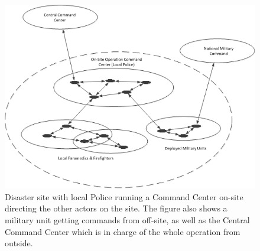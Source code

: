 \begin{figure}[ht!]
  \centering
  \includegraphics{images/scenario.png}
  \caption{Disaster site with local Police running a Command Center on-site directing the other actors on the site. The figure also shows a military unit getting commands from off-site, as well as the Central Command Center which is in charge of the whole operation from outside.}
  \label{fig:scenario}
\end{figure}


